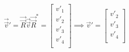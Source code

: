 \documentclass{article}
\begin{document}
\begin{equation}
    \vec{\vec{v}}' = \vec{\vec{R}}\vec{\vec{v}}\vec{\vec{R}}^* = \begin{bmatrix}
        v'_1\\
        v'_2\\
        v'_3 \\
        v'_4 \\
    \end{bmatrix}
    \implies
    \vec{v}' = \begin{bmatrix}
        v'_2\\
        v'_3 \\
        v'_4 \\
    \end{bmatrix}
\end{equation}
\end{document}
